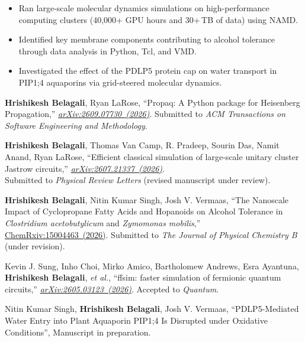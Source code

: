 \documentclass[9pt]{developercv} %
\let\oldhref\href
\newcommand{\linkul}[1]{\setbox0\hbox{#1}\rlap{\textcolor{black!35}{\rule[-1.6pt]{\wd0}{0.3pt}}}\box0}
\renewcommand{\href}[2]{\oldhref{#1}{\linkul{#2}}}
\begin{document}
\begin{entrylist}
{\begin{itemize}[noitemsep,topsep=0pt,parsep=0pt,partopsep=0pt, leftmargin=7pt]
			\item Ran large-scale molecular dynamics simulations on high-performance computing clusters (40,000+ GPU hours and 30+\,TB of data) using NAMD.
			\item Identified key membrane components contributing to alcohol tolerance through data analysis in Python, Tcl, and VMD.
			\item Investigated the effect of the PDLP5 protein cap on water transport in PIP1;4 aquaporins via grid-steered molecular dynamics.
		\end{itemize}
		}
\end{entrylist}
\vspace*{-7pt}

\begin{enumerate}[label={[\arabic*]}, noitemsep, topsep=0pt, parsep=2pt, partopsep=0pt, leftmargin=18pt]
	\item \textbf{Hrishikesh Belagali}, Ryan LaRose, ``Propaq: A Python package for Heisenberg Propagation,'' \href{https://arxiv.org/abs/2609.07730}{\emph{arXiv:2609.07730 (2026)}}. Submitted to \emph{ACM Transactions on Software Engineering and Methodology}.
	\item \textbf{Hrishikesh Belagali}, Thomas Van Camp, R. Pradeep, Sourin Das, Namit Anand, Ryan LaRose, ``Efficient classical simulation of large-scale unitary cluster Jastrow circuits,'' \href{https://arxiv.org/abs/2607.21337}{\emph{arXiv:2607.21337 (2026)}}. \\Submitted to \emph{Physical Review Letters} (revised manuscript under review).
	\item \textbf{Hrishikesh Belagali}, Nitin Kumar Singh, Josh V. Vermaas, ``The Nanoscale Impact of Cyclopropane Fatty Acids and Hopanoids on Alcohol Tolerance in \textit{Clostridium acetobutylicum} and \textit{Zymomonas mobilis},'' \href{https://chemrxiv.org/doi/full/10.26434/chemrxiv.15004463/v1}{ChemRxiv:15004463 (2026)}. Submitted to \emph{The Journal of Physical Chemistry B} (under revision).
	\item Kevin J. Sung, Inho Choi, Mirko Amico, Bartholomew Andrews, Esra Ayantuna, \textbf{Hrishikesh Belagali}, \emph{et al.}, ``ffsim: faster simulation of fermionic quantum circuits,'' \href{https://arxiv.org/abs/2605.03123}{\emph{arXiv:2605.03123 (2026)}}. Accepted to \emph{Quantum}.
	\item Nitin Kumar Singh, \textbf{Hrishikesh Belagali}, Josh V. Vermaas, ``PDLP5-Mediated Water Entry into Plant Aquaporin PIP1;4 Is Disrupted under Oxidative Conditions'', Manuscript in preparation.
\end{enumerate}
\end{document}

